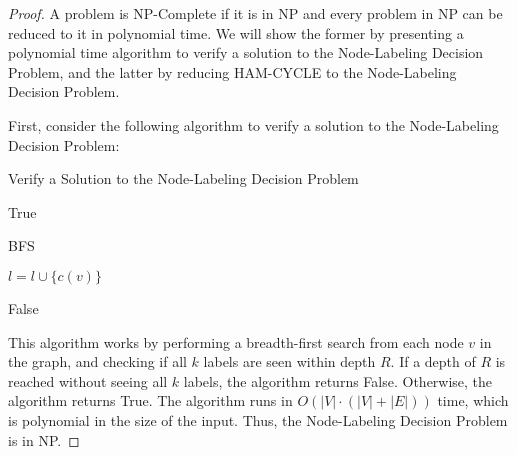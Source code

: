 \documentclass{article}
\begin{document}
\begin{proof}
    A problem is NP-Complete if it is in NP and every problem in NP can be reduced to it in polynomial time.
    We will show the former by presenting a polynomial time algorithm to verify a solution to the Node-Labeling Decision Problem,
    and the latter by reducing HAM-CYCLE to the Node-Labeling Decision Problem.
    
    First, consider the following algorithm to verify a solution to the Node-Labeling Decision Problem:

    \begin{algorithm}[H]
        \caption{Verify a Solution to the Node-Labeling Decision Problem}
        \BlankLine
        
        \Return True
    \end{algorithm}
    
    \begin{algorithm}[H]
        \caption{BFS}
        \BlankLine
        
        
        $l = l \cup \{c(v)\}$
        
        
        
        \Return False
    \end{algorithm}
    
    This algorithm works by performing a breadth-first search from each node $v$ in the graph,
    and checking if all $k$ labels are seen within depth $R$.
    If a depth of $R$ is reached without seeing all $k$ labels, the algorithm returns False.
    Otherwise, the algorithm returns True.
    The algorithm runs in $O(|V| \cdot (|V| + |E|))$ time, which is polynomial in the size of the input.
    Thus, the Node-Labeling Decision Problem is in NP.


\end{proof}
\end{document}
